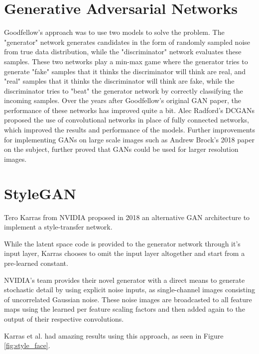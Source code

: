 \section{Generative Adversarial Networks}
Goodfellow's approach was to use two models to solve the problem. The "generator" network generates candidates in the form of randomly sampled noise from true data distribution, while the "discriminator" network evaluates these samples. These two networks play a min-max game where the generator tries to generate "fake" samples that it thinks the discriminator will think are real, and "real" samples that it thinks the discriminator will think are fake, while the discriminator tries to "beat" the generator network by correctly classifying the incoming samples.
Over the years after Goodfellow's original GAN paper, the performance of these networks has improved quite a bit. Alec Radford's DCGANs\cite{radford_metz_chintala_2015} proposed the use of convolutional networks in place of fully connected networks, which improved the results and performance of the models. Further improvements for implementing GANs on large scale images such as Andrew Brock's 2018 \cite{DBLP:journals/corr/abs-1809-11096} paper on the subject, further proved that GANs could be used for larger resolution images.

\section{StyleGAN}

Tero Karras from NVIDIA proposed in 2018 an alternative GAN architecture to implement a style-transfer network.\cite{DBLP:journals/corr/abs-1912-04958} 

While the latent space code is provided to the generator network through it's input layer, Karras chooses to omit the input layer altogether and start from a pre-learned constant. 

NVIDIA's team provides their novel generator with a direct means to generate stochastic detail by using explicit noise inputs, as single-channel images consisting of uncorrelated Gaussian noise. These noise images are broadcasted to all feature maps using the learned per feature scaling factors and then added again to the output of their respective convolutions. 

Karras et al. had amazing results using this approach, as seen in Figure \ref{fig:style_face}.

